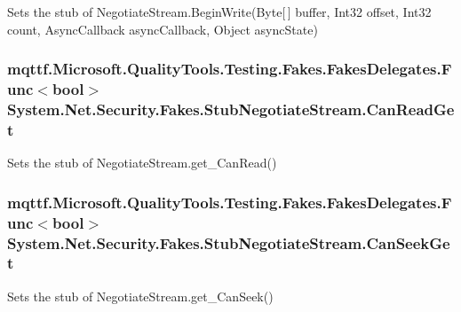 Sets the stub of Negotiate\-Stream.\-Begin\-Write(\-Byte\mbox{[}$\,$\mbox{]} buffer, Int32 offset, Int32 count, Async\-Callback async\-Callback, Object async\-State)

\hypertarget{class_system_1_1_net_1_1_security_1_1_fakes_1_1_stub_negotiate_stream_a75ca9e085dcb7e7c01b4e75602148e4f}{
\subsubsection[{Can\-Read\-Get}]{\setlength{\rightskip}{0pt plus 5cm}mqttf.\-Microsoft.\-Quality\-Tools.\-Testing.\-Fakes.\-Fakes\-Delegates.\-Func$<$bool$>$ System.\-Net.\-Security.\-Fakes.\-Stub\-Negotiate\-Stream.\-Can\-Read\-Get}}\label{class_system_1_1_net_1_1_security_1_1_fakes_1_1_stub_negotiate_stream_a75ca9e085dcb7e7c01b4e75602148e4f}


Sets the stub of Negotiate\-Stream.\-get\-\_\-\-Can\-Read()

\hypertarget{class_system_1_1_net_1_1_security_1_1_fakes_1_1_stub_negotiate_stream_a97b555c72009dcdaec1a2043b573210c}{
\subsubsection[{Can\-Seek\-Get}]{\setlength{\rightskip}{0pt plus 5cm}mqttf.\-Microsoft.\-Quality\-Tools.\-Testing.\-Fakes.\-Fakes\-Delegates.\-Func$<$bool$>$ System.\-Net.\-Security.\-Fakes.\-Stub\-Negotiate\-Stream.\-Can\-Seek\-Get}}\label{class_system_1_1_net_1_1_security_1_1_fakes_1_1_stub_negotiate_stream_a97b555c72009dcdaec1a2043b573210c}


Sets the stub of Negotiate\-Stream.\-get\-\_\-\-Can\-Seek()

